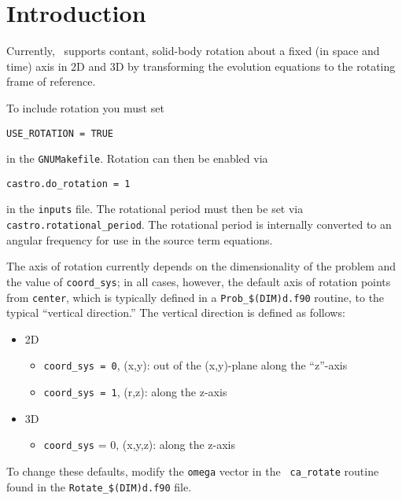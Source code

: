 \label{ch:rotation}

\section{Introduction}

Currently, \castro\ supports contant, solid-body rotation about a fixed
(in space and time) axis in 2D and 3D by transforming the evolution
equations to the rotating frame of reference.  

To include rotation you must set
\begin{verbatim}
USE_ROTATION = TRUE
\end{verbatim}
in the {\tt GNUMakefile}.  Rotation can then be enabled via
\begin{verbatim}
castro.do_rotation = 1
\end{verbatim}
in the {\tt inputs} file.  The rotational period must then be set via
{\tt castro.rotational\_period}.  The rotational period is internally
converted to an angular frequency for use in the source term
equations.

The axis of rotation currently depends on the dimensionality of the
problem and the value of {\tt coord\_sys}; in all cases, however, the
default axis of rotation points from {\tt center}, which is typically
defined in a {\tt Prob\_\$(DIM)d.f90} routine, to the typical ``vertical
direction.''  The vertical direction is defined as follows:
\begin{itemize}
\item 2D
\begin{itemize}
\item {\tt coord\_sys = 0}, (x,y): out of the (x,y)-plane along the ``z''-axis
\item {\tt coord\_sys = 1}, (r,z): along the z-axis
\end{itemize}

\item 3D
\begin{itemize}
\item {\tt coord\_sys} = 0, (x,y,z): along the z-axis
\end{itemize}
\end{itemize}
To change these defaults, modify the {\tt omega} vector in the {\tt
  ca\_rotate} routine found in the {\tt Rotate\_\$(DIM)d.f90} file.


